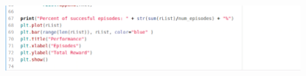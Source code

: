 \begin{figure}[ht]
	\centering
	\includegraphics*[width=15cm,height=20cm,keepaspectratio]{figuras/nchain3} 
	\label{fig:nchain code 3}
\end{figure}

